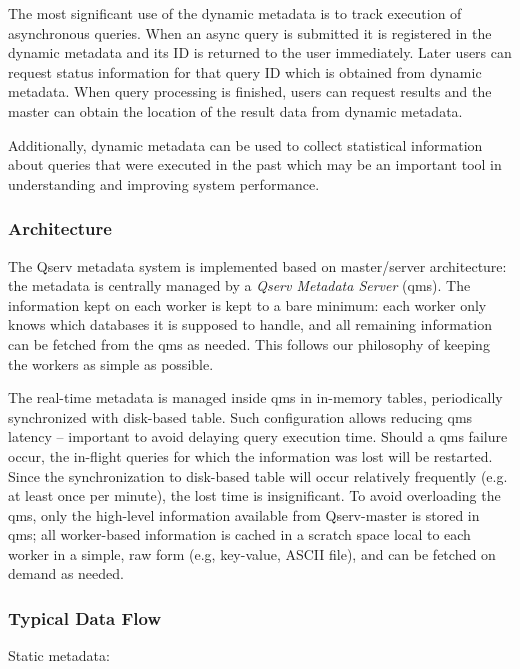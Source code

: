 \documentclass[DM,lsstdraft,toc]{lsstdoc}
\begin{document}
The most significant use of the dynamic metadata is to track execution
of asynchronous queries. When an async query is submitted it is
registered in the dynamic metadata and its ID is returned to the user
immediately. Later users can request status information for that query
ID which is obtained from dynamic metadata. When query processing is
finished, users can request results and the master can
obtain the location of the result data from dynamic metadata.

Additionally, dynamic metadata can be used to collect statistical
information about queries that were executed in the past which may be an
important tool in understanding and improving system performance.

\subsubsection{Architecture}\label{architecture}

The Qserv metadata system is implemented based on master/server
architecture: the metadata is centrally managed by a \emph{Qserv
Metadata Server} (qms). The information kept on each worker is kept to a
bare minimum: each worker only knows which databases it is supposed to
handle, and all remaining information can be fetched from the qms
as needed. This follows our philosophy of keeping the workers as
simple as possible.

The real-time metadata is managed inside qms in in-memory tables,
periodically synchronized with disk-based table. Such configuration
allows reducing qms latency -- important to avoid delaying query
execution time. Should a qms failure occur, the in-flight queries for
which the information was lost will be restarted. Since the
synchronization to disk-based table will occur relatively frequently
(e.g. at least once per minute), the lost time is insignificant. To avoid
overloading the qms, only the high-level information available from
Qserv-master is stored in qms; all worker-based information is cached in
a scratch space local to each worker in a simple, raw form (e.g,
key-value, ASCII file), and can be fetched on demand as needed.

\subsubsection{Typical Data Flow}\label{typical-data-flow}

Static metadata:
\end{document}
